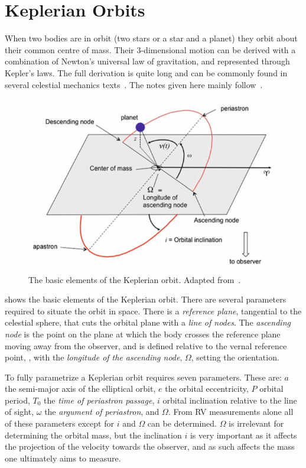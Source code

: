
\section{Keplerian Orbits}

When two bodies are in orbit (two stars or a star and a planet) they orbit about their common centre of mass.
Their 3-dimensional motion can be derived with a combination of Newton's universal law of gravitation, and represented through Kepler's laws.
The full derivation is quite long and can be commonly found in several celestial mechanics texts~\citep[e.g.][]{moulton_introduction_1914, perryman_exoplanet_2011, fitzpatrick_introduction_2012}.
The notes given here mainly follow~\citet{bozza_methods_2016}.

\begin{figure}
    \centering
    \includegraphics[width=0.6\linewidth]{figures/fundamental_rv/orbit_diagram2.pdf}
    \caption[The basic elements of the Keplerian orbit.]{The basic elements of the Keplerian orbit.
        Adapted from~\citet{bozza_methods_2016}.}
    \label{fig:orbitdiagram}
\end{figure}

 shows the basic elements of the Keplerian orbit.
There are several parameters required to situate the orbit in space.
There is a \textit{reference plane}, tangential to the celestial sphere, that cuts the orbital plane with a \textit{line of nodes}.
The \textit{ascending node} is the point on the plane at which the body crosses the reference plane moving away from the observer, and is defined relative to the vernal reference point, \Aries, with the \textit{longitude of the ascending node}, $\Omega$, setting the orientation.

To fully parametrize a Keplerian orbit requires seven parameters.
These are: $a$ the semi-major axis of the elliptical orbit, $e$ the orbital eccentricity, $P$ orbital period, $T_0$ the \emph{time of periastron passage}, $i$ orbital inclination relative to the line of sight, \(\omega\) the \emph{argument of periastron}, and $\Omega$.
From {RV} measurements alone all of these parameters except for $i$ and $\Omega$ can be determined.
$\Omega$ is irrelevant for determining the orbital mass, but the inclination $i$ is very important as it affects the projection of the velocity towards the observer, and as such affects the mass one ultimately aims to measure.


